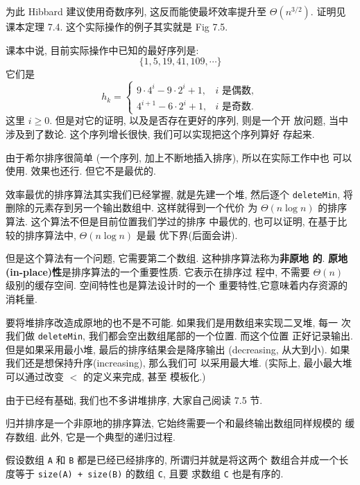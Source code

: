 \documentclass[a4paper]{ctexart}
\theoremstyle{definition}
\theoremstyle{definition}
\begin{document}
为此 Hibbard 建议使用奇数序列, 这反而能使最坏效率提升至 $\Theta(n^{3 /
  2})$. 证明见课本定理 7.4. 这个实际操作的例子其实就是 Fig 7.5.

课本中说, 目前实际操作中已知的最好序列是:
$$
\{1, 5, 19, 41, 109, \cdots\}
$$
它们是
$$
h_k = \left\{
\begin{array}{ll}
  9 \cdot 4^i - 9 \cdot 2^i + 1, & \mbox{$i$ 是偶数},\\
  4^{i + 1} - 6 \cdot 2^i + 1, & \mbox{$i$ 是奇数}.
\end{array}
\right.
$$
这里 $i \geq 0$. 但是对它的证明, 以及是否存在更好的序列, 则是一个开
放问题, 当中涉及到了数论. 这个序列增长很快, 我们可以实现把这个序列算好
存起来.

由于希尔排序很简单 (一个序列, 加上不断地插入排序), 所以在实际工作中也
可以使用. 效果也还行. 但它不是最优的.


效率最优的排序算法其实我们已经掌握, 就是先建一个堆, 然后逐个
\verb|deleteMin|, 将删除的元素存到另一个输出数组中. 这样就得到一个代价
为 $\Theta(n \log n)$ 的排序算法. 这个算法不但是目前位置我们学过的排序
中最优的, 也可以证明, 在基于比较的排序算法中, $\Theta(n \log n)$ 是最
优下界(后面会讲).

但是这个算法有一个问题, 它需要第二个数组. 这种排序算法称为{\bf 非原地
  的}. {\bf 原地(in-place)性}是排序算法的一个重要性质. 它表示在排序过
程中, 不需要 $\Theta(n)$ 级别的缓存空间. 空间特性也是算法设计时的一个
重要特性,它意味着内存资源的消耗量.

要将堆排序改造成原地的也不是不可能. 如果我们是用数组来实现二叉堆, 每一
次我们做 \verb|deleteMin|, 我们都会空出数组尾部的一个位置. 而这个位置
正好记录输出. 但是如果采用最小堆, 最后的排序结果会是降序输出
(decreasing, 从大到小). 如果我们还是想保持升序(increasing), 那么我们可
以采用最大堆.  (实际上, 最小最大堆可以通过改变 $<$ 的定义来完成, 甚至
模板化.)

由于已经有基础, 我们也不多讲堆排序, 大家自己阅读 7.5 节.


归并排序是一个非原地的排序算法, 它始终需要一个和最终输出数组同样规模的
缓存数组. 此外, 它是一个典型的递归过程.

假设数组 \verb|A| 和 \verb|B| 都是已经已经排序的, 所谓归并就是将这两个
数组合并成一个长度等于 \verb|size(A) + size(B)| 的数组 \verb|C|, 且要
求数组 \verb|C| 也是有序的.
\end{document}
